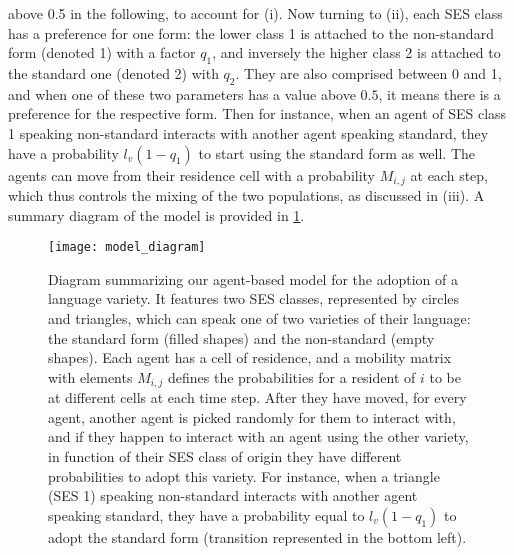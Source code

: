 \documentclass[../thesis.tex]{subfiles}
\begin{document}
above 0.5 in the following, to account for (i). Now turning to (ii), each \ac{SES} class
has a preference for one form: the lower class 1 is attached to the non-standard form
(denoted 1) with a factor $q_1$, and inversely the higher class 2 is attached to the
standard one (denoted 2) with $q_2$. They are also comprised between 0 and 1, and when
one of these two parameters has a value above $0.5$, it means there is a preference for
the respective form. Then for instance, when an agent of \ac{SES} class 1 speaking
non-standard interacts with another agent speaking standard, they have a probability
$l_v (1 - q_1)$ to start using the standard form as well. The agents can move from their
residence cell with a probability $M_{i,j}$ at each step, which thus controls the mixing
of the two populations, as discussed in (iii). A summary diagram of the model is
provided in \cref{fig:model_diagram}.
\begin{figure}
\centering
  \texttt{[image: model\_diagram]}
  \caption{Diagram summarizing our agent-based model for the adoption of a language
  variety. It features two \ac{SES} classes, represented by circles and triangles, which
  can speak one of two varieties of their language: the standard form (filled shapes)
  and the non-standard (empty shapes). Each agent has a cell of residence, and a
  mobility matrix with elements $M_{i, j}$ defines the probabilities for a resident of
  $i$ to be at different cells at each time step. After they have moved, for every
  agent, another agent is picked randomly for them to interact with, and if they happen
  to interact with an agent using the other variety, in function of their \ac{SES} class
  of origin they have different probabilities to adopt this variety. For instance, when
  a triangle (\ac{SES} 1) speaking non-standard interacts with another agent speaking
  standard, they have a probability equal to $l_v (1 - q_1)$ to adopt the standard form
  (transition represented in the bottom left).}
  \label{fig:model_diagram}
\end{figure}
\end{document}
